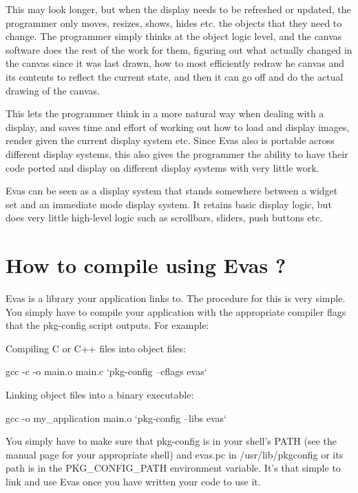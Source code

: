 This may look longer, but when the display needs to be refreshed or updated, the programmer only moves, resizes, shows, hides etc. the objects that they need to change. The programmer simply thinks at the object logic level, and the canvas software does the rest of the work for them, figuring out what actually changed in the canvas since it was last drawn, how to most efficiently redraw he canvas and its contents to reflect the current state, and then it can go off and do the actual drawing of the canvas.

This lets the programmer think in a more natural way when dealing with a display, and saves time and effort of working out how to load and display images, render given the current display system etc. Since Evas also is portable across different display systems, this also gives the programmer the ability to have their code ported and display on different display systems with very little work.

Evas can be seen as a display system that stands somewhere between a widget set and an immediate mode display system. It retains basic display logic, but does very little high-\/level logic such as scrollbars, sliders, push buttons etc.\hypertarget{index_compiling}{}\section{How to compile using Evas ?}\label{index_compiling}
Evas is a library your application links to. The procedure for this is very simple. You simply have to compile your application with the appropriate compiler flags that the {\ttfamily pkg-\/config} script outputs. For example:

Compiling C or C++ files into object files:

\begin{DoxyVerb}
gcc -c -o main.o main.c `pkg-config --cflags evas`
\end{DoxyVerb}


Linking object files into a binary executable:

\begin{DoxyVerb}
gcc -o my_application main.o `pkg-config --libs evas`
\end{DoxyVerb}


You simply have to make sure that pkg-\/config is in your shell's PATH (see the manual page for your appropriate shell) and evas.pc in /usr/lib/pkgconfig or its path is in the PKG\_\-CONFIG\_\-PATH environment variable. It's that simple to link and use Evas once you have written your code to use it.

